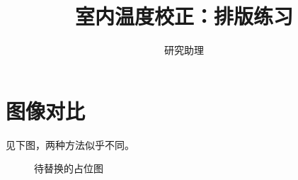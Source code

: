 \documentclass[UTF8,fontset=fandol,a4paper,11pt]{ctexart}
\title{室内温度校正：排版练习}
\author{研究助理}
\date{}
\begin{document}
\maketitle
\section{图像对比}
见下图，两种方法似乎不同。
\begin{figure}[ht]\centering
\fbox{\rule{0pt}{35mm}\rule{0.65\linewidth}{0pt}}
\caption{待替换的占位图}
\end{figure}
\end{document}
